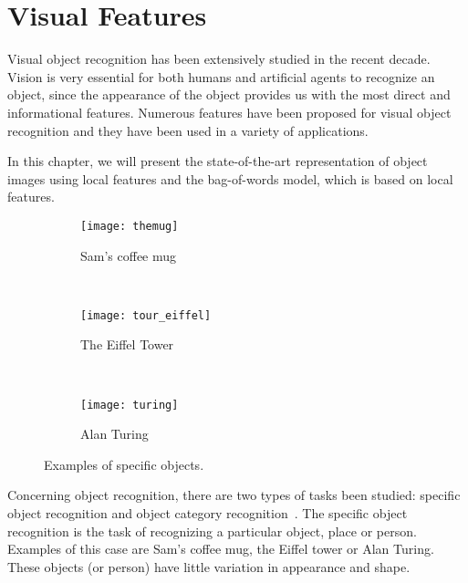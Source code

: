 \documentclass[12pt,final,twoside]{report}
\begin{document}
\chapter{Visual Features}
\label{ch:visual}

Visual object recognition has been extensively studied in the recent decade. Vision is very essential for both humans and artificial agents to recognize an object, since the appearance of the object provides us with the most direct and informational features. Numerous features have been proposed for visual object recognition and they have been used in a variety of applications.

In this chapter, we will present the state-of-the-art representation of object images using local features and the bag-of-words model, which is based on local features.

\iffalse
\begin{figure}[tbhp]
  \centering
  \begin{subfigure}[b]{.3\textwidth}
    \texttt{[image: themug]}
    \caption{Sam's coffee mug}
  \end{subfigure}
  ~
  \begin{subfigure}[b]{.3\textwidth}
    \centering
    \texttt{[image: tour\_eiffel]}
    \caption{The Eiffel Tower\footnotemark}
  \end{subfigure}
  ~
  \begin{subfigure}[b]{.3\textwidth}
    \texttt{[image: turing]}
    \caption{Alan Turing}
  \end{subfigure}
  \caption{Examples of specific objects.}
  \label{fig:specific}
\end{figure}

Concerning object recognition, there are two types of tasks been studied: specific object recognition and object category recognition~\cite{grauman_visual_2011}. The specific object recognition is the task of recognizing a particular object, place or person. Examples of this case are Sam's coffee mug, the Eiffel tower or Alan Turing. These objects (or person) have little variation in appearance and shape. 
\end{document}
